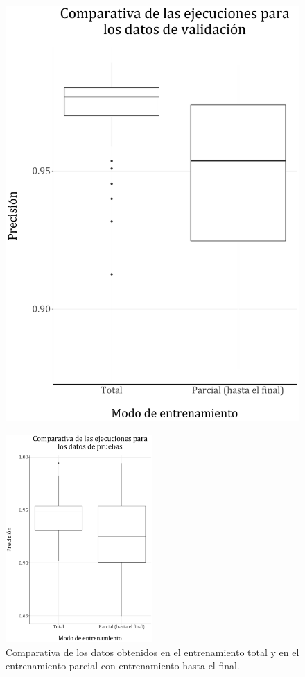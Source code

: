 \documentclass[spanish,a4paper,12pt,twoside]{report}
\begin{document}
\begin{figure}[H]
\begin{minipage}{0.49\textwidth}
      \includegraphics[width = 1\linewidth]{resources/Fig23_2.pdf}
    \end{minipage}
  \end{figure}
  \begin{figure}[H]
    \centering
    \includegraphics[width = 0.5\textwidth]{resources/Fig23_3.pdf}
    \caption{Comparativa de los datos obtenidos en el entrenamiento total y en el entrenamiento parcial con entrenamiento hasta el final.}
    \label{fig:23}
  \end{figure} \par
\end{document}
